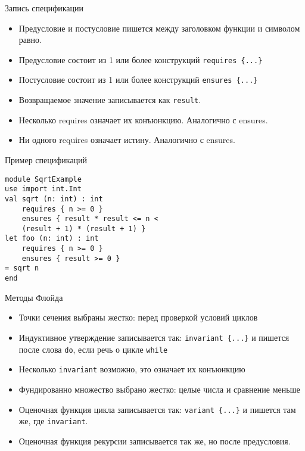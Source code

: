 \documentclass[hyperref={unicode=true}]{beamer}
\begin{document}
    \begin{frame}{Запись спецификации}
    \begin{itemize}
    \item
    Предусловие и постусловие пишется
    между заголовком функции и символом равно.
    \item
    Предусловие состоит из 1 или более
    конструкций \texttt{requires \{...\} }
    \item
    Постусловие состоит из 1 или более
    конструкций \texttt{ensures \{...\} }
    \item
    Возвращаемое значение записывается как \texttt{result}.
    \item
    Несколько requires означает их конъюнкцию. Аналогично с ensures.
    \item
    Ни одного requires означает истину. Аналогично с ensures.
    \end{itemize}
    \end{frame}

    \begin{frame}[fragile]{Пример спецификаций}
    \begin{lstlisting}
module SqrtExample
use import int.Int
val sqrt (n: int) : int
    requires { n >= 0 }
    ensures { result * result <= n <
    (result + 1) * (result + 1) }
let foo (n: int) : int
    requires { n >= 0 }
    ensures { result >= 0 }
= sqrt n
end
    \end{lstlisting}
    \end{frame}

    \begin{frame}{Методы Флойда}
    \begin{itemize}
    \item
    Точки сечения выбраны жестко: перед проверкой
    условий циклов
    \item
    Индуктивное утверждение записывается так: \texttt{invariant \{...\}}
    и пишется после слова \texttt{do}, если речь о цикле \texttt{while}
    \item
    Несколько \texttt{invariant} возможно, это означает их конъюнкцию
    \item
    Фундированно множество выбрано жестко: целые числа и сравнение меньше
    \item
    Оценочная функция цикла записывается так: \texttt{variant \{...\}}
    и пишется там же, где \texttt{invariant}.
    \item
    Оценочная функция рекурсии записывается так же, но после предусловия.
    \end{itemize}
    \end{frame}
\end{document}

